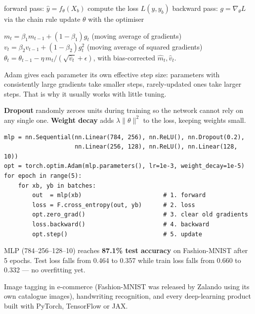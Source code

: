 \documentclass[11pt,a4paper]{article}
\begin{document}
\begin{balgo}
\begin{algorithmic}[1]
    \State forward pass: $\hat y=f_\theta(X_b)$
    \State compute the loss $L(\hat y,y_b)$
    \State backward pass: $g=\nabla_\theta L$ via the chain rule
    \State update $\theta$ with the optimiser
  \EndFor
\EndFor
\end{algorithmic}
\end{balgo}
\begin{bmath}
$m_t=\beta_1m_{t-1}+(1-\beta_1)g_t$ (moving average of gradients)\\
$v_t=\beta_2v_{t-1}+(1-\beta_2)g_t^2$ (moving average of squared gradients)\\
$\theta_t=\theta_{t-1}-\eta\,\hat m_t/(\sqrt{\hat v_t}+\epsilon)$, with bias-corrected $\hat m_t,\hat v_t$.
\end{bmath}
Adam gives each parameter its own effective step size: parameters with consistently large gradients take smaller steps, rarely-updated ones take larger steps. That is why it usually works with little tuning.
\begin{bdef}[Regularisation]
\textbf{Dropout} randomly zeroes units during training so the network cannot rely on any single one. \textbf{Weight decay} adds $\lambda\lVert\theta\rVert^2$ to the loss, keeping weights small.
\end{bdef}

\begin{bcode}
\begin{lstlisting}
mlp = nn.Sequential(nn.Linear(784, 256), nn.ReLU(), nn.Dropout(0.2),
                    nn.Linear(256, 128), nn.ReLU(), nn.Linear(128, 10))
opt = torch.optim.Adam(mlp.parameters(), lr=1e-3, weight_decay=1e-5)
for epoch in range(5):
    for xb, yb in batches:
        out  = mlp(xb)                       # 1. forward
        loss = F.cross_entropy(out, yb)      # 2. loss
        opt.zero_grad()                      # 3. clear old gradients
        loss.backward()                      # 4. backward
        opt.step()                           # 5. update
\end{lstlisting}
\end{bcode}
\begin{bres}
MLP (784--256--128--10) reaches \textbf{87.1\% test accuracy} on Fashion-MNIST after 5 epochs. Test loss falls from 0.464 to 0.357 while train loss falls from 0.660 to 0.332 --- no overfitting yet.
\end{bres}
\begin{bapp}
Image tagging in e-commerce (Fashion-MNIST was released by Zalando using its own catalogue images), handwriting recognition, and every deep-learning product built with PyTorch, TensorFlow or JAX.
\end{bapp}
\end{document}

